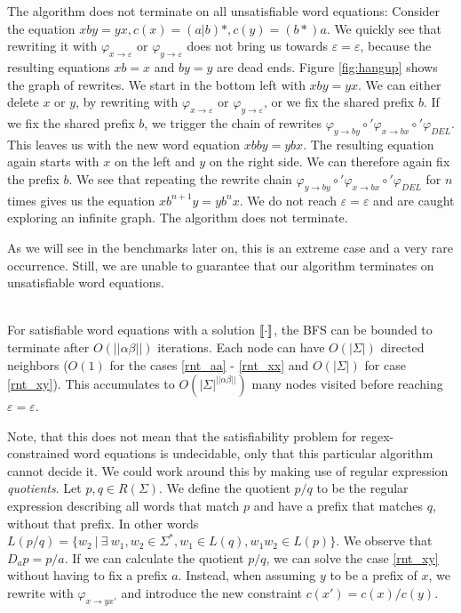 The algorithm does not terminate on all unsatisfiable word equations: Consider the equation
$xby = yx, c(x) = (a|b)*, c(y) = (b*)a$. We quickly see that rewriting it with $\varphi_{x \rightarrow \varepsilon}$ or $\varphi_{y \rightarrow \varepsilon}$ does not bring us towards $\varepsilon = \varepsilon$, because the resulting equations $xb = x$ and $by = y$ are dead ends.
Figure \ref{fig:hangup} shows the graph of rewrites. We start in the bottom left with $xby = yx$. We can either delete $x$ or $y$, by rewriting with $\varphi_{x \rightarrow \varepsilon}$ or $\varphi_{y \rightarrow \varepsilon}$, or we fix the shared prefix $b$. If we fix the shared prefix $b$, we trigger the chain of rewrites $\varphi_{y \rightarrow by} \circ' \varphi_{x \rightarrow bx} \circ' \varphi_{DEL}$. This leaves us with the new word equation $xbby = ybx$. The resulting equation again starts with $x$ on the left and $y$ on the right side. We can therefore again fix the prefix $b$. We see that repeating the rewrite chain $\varphi_{y \rightarrow by} \circ' \varphi_{x \rightarrow bx} \circ' \varphi_{DEL}$ for $n$ times gives us the equation $xb^{n+1}y = yb^nx$. We do not reach $\varepsilon = \varepsilon$ and are caught exploring an infinite graph. The algorithm does not terminate.

As we will see in the benchmarks later on, this is an extreme case and a very rare occurrence. Still, we are unable to guarantee that our algorithm terminates on unsatisfiable word equations.

~\\
For satisfiable word equations with a solution $\llbracket \cdot \rrbracket$, the BFS can be bounded to terminate after $O(||\alpha\beta||)$ iterations. Each node can have $O(|\Sigma|)$ directed neighbors ($O(1)$ for the cases \ref{rnt_aa} - \ref{rnt_xx} and $O(|\Sigma|)$ for case \ref{rnt_xy}). This accumulates to $O(|\Sigma|^{||\alpha\beta||})$ many nodes visited before reaching $\varepsilon = \varepsilon$.

Note, that this does not mean that the satisfiability problem for regex-constrained word equations is undecidable, only that this particular algorithm cannot decide it. We could work around this by making use of regular expression \textit{quotients}.
Let $p, q \in R(\Sigma)$. We define the quotient $p/q$ to be the regular expression describing all words that match $p$ and have a prefix that matches $q$, without that prefix. In other words $L(p/q) = \{w_2\:|\:\exists\:w_1, w_2 \in \Sigma^*, w_1 \in L(q), w_1w_2 \in L(p)\}$. We observe that $D_ap = p/a$. If we can calculate the quotient $p/q$, we can solve the case \ref{rnt_xy} without having to fix a prefix $a$. Instead, when assuming $y$ to be a prefix of $x$, we rewrite with $\varphi_{x \rightarrow yx'}$ and introduce the new constraint $c(x') = c(x)/c(y)$.

